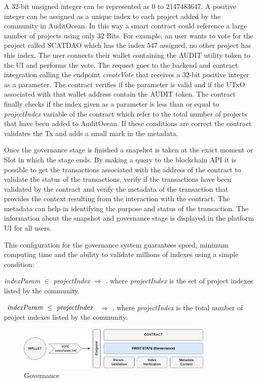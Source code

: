 \documentclass[9pt]{article}
\begin{document}
A 32-bit unsigned integer can be represented as 0 to 2147483647. A positive integer can be assigned as a unique index to each project added by the community in AuditOcean. In this way a smart contract could reference a large number of projects using only 32 Bits. For example, an user wants to vote for the project called SCATDAO which has the index 547 assigned, no other project has this index. The user connects their wallet containing the AUDIT utility token to the UI and performs the vote. The request goes to the backend and contract integration calling the endpoint \emph{ createVote } that receives a 32-bit positive integer as a parameter. The contract verifies if the parameter is valid and if the UTxO associated with that wallet address contain the AUDIT token. The contract finally checks if the index given as a parameter is less than or equal to \emph{projectIndex} variable of the contract which refer to the total number of projects that have been added to AuditOcean. If these conditions are correct the contract validates the Tx and adds a small mark in the metadata.


Once the governance stage is finished a snapshot is taken at the exact moment or Slot in which the stage ends. By making a query to the blockchain API it is possible to get the transactions associated with the address of the contract to validate the status of the transactions, verify if the transactions have been validated by the contract and verify the metadata of the transaction that provides the context resulting from the interaction with the contract. The metadata can help in identifying the purpose and status of the transaction. The information about the snapshot and governance stage is displayed in the platform UI for all users.

This configuration for the governance system guarantees speed, minimum computing time and the ability to validate millions of indexes using a simple condition:

\emph{ indexParam } $\in$ \emph{ projectIndex } $\Rightarrow$ . 
 where \emph{ projectIndex } is the set of project indexes listed by the community. 

$\emph{ indexParam } \leq \emph{ projectIndex }$  $\Rightarrow$ . where \emph{ projectIndex } is the total number of project indexes listed by the community.

\begin{figure}[ht]
  \centering
  \includegraphics[width=0.85\textwidth]{vote.png}
  \caption{Governance
  }
  \label{fig:mi_imagen}
\end{figure}
\end{document}
